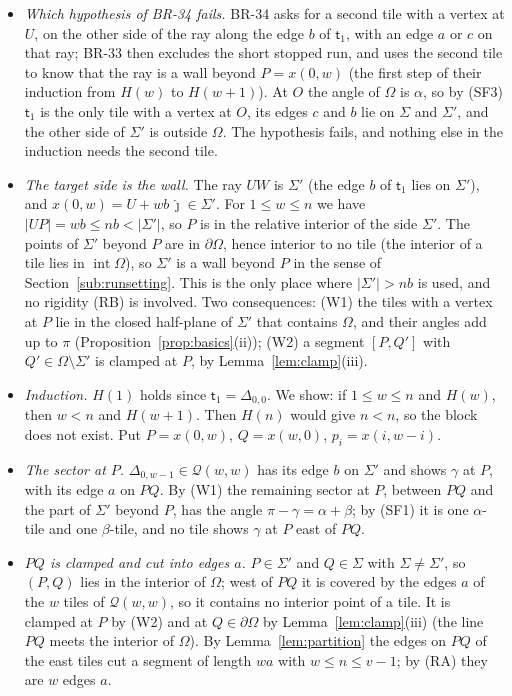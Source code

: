 \documentclass[11pt,reqno]{amsart}
\theoremstyle{plain}
\theoremstyle{definition}
\begin{document}
\begin{itemize}
\item[\textbf{Cr0}] \emph{Which hypothesis of BR-34 fails.} BR-34 asks for a second tile with a vertex at $U$, on the other side of the ray along the edge $b$ of $\mathsf t_1$, with an edge $a$ or $c$ on that ray; BR-33 then excludes the short stopped run, and uses the second tile to know that the ray is a wall beyond $P=x(0,w)$ (the first step of their induction from $H(w)$ to $H(w+1)$). At $O$ the angle of $\Omega$ is $\alpha$, so by (SF3) $\mathsf t_1$ is the only tile with a vertex at $O$, its edges $c$ and $b$ lie on $\Sigma$ and $\Sigma'$, and the other side of $\Sigma'$ is outside $\Omega$. The hypothesis fails, and nothing else in the induction needs the second tile.
\item[\textbf{Cr1}] \emph{The target side is the wall.} The ray $UW$ is $\Sigma'$ (the edge $b$ of $\mathsf t_1$ lies on $\Sigma'$), and $x(0,w)=U+wb\,\hat\jmath\in\Sigma'$. For $1\le w\le n$ we have $|UP|=wb\le nb<|\Sigma'|$, so $P$ is in the relative interior of the side $\Sigma'$. The points of $\Sigma'$ beyond $P$ are in $\partial\Omega$, hence interior to no tile (the interior of a tile lies in $\operatorname{int}\Omega$), so $\Sigma'$ is a wall beyond $P$ in the sense of Section~\ref{sub:runsetting}. This is the only place where $|\Sigma'|>nb$ is used, and no rigidity (RB) is involved. Two consequences: \textup{(W1)} the tiles with a vertex at $P$ lie in the closed half-plane of $\Sigma'$ that contains $\Omega$, and their angles add up to $\pi$ (Proposition~\ref{prop:basics}(ii)); \textup{(W2)} a segment $[P,Q']$ with $Q'\in\Omega\setminus\Sigma'$ is clamped at $P$, by Lemma~\ref{lem:clamp}(iii).
\item[\textbf{Cr2}] \emph{Induction.} $H(1)$ holds since $\mathsf t_1=\Delta_{0,0}$. We show: if $1\le w\le n$ and $H(w)$, then $w<n$ and $H(w+1)$. Then $H(n)$ would give $n<n$, so the block does not exist. Put $P=x(0,w)$, $Q=x(w,0)$, $p_i=x(i,w-i)$.
\item[\textbf{Cr3}] \emph{The sector at $P$.} $\Delta_{0,w-1}\in\mathcal Q(w,w)$ has its edge $b$ on $\Sigma'$ and shows $\gamma$ at $P$, with its edge $a$ on $PQ$. By (W1) the remaining sector at $P$, between $PQ$ and the part of $\Sigma'$ beyond $P$, has the angle $\pi-\gamma=\alpha+\beta$; by (SF1) it is one $\alpha$-tile and one $\beta$-tile, and no tile shows $\gamma$ at $P$ east of $PQ$.
\item[\textbf{Cr4}] \emph{$PQ$ is clamped and cut into edges $a$.} $P\in\Sigma'$ and $Q\in\Sigma$ with $\Sigma\ne\Sigma'$, so $(P,Q)$ lies in the interior of $\Omega$; west of $PQ$ it is covered by the edges $a$ of the $w$ tiles of $\mathcal Q(w,w)$, so it contains no interior point of a tile. It is clamped at $P$ by (W2) and at $Q\in\partial\Omega$ by Lemma~\ref{lem:clamp}(iii) (the line $PQ$ meets the interior of $\Omega$). By Lemma~\ref{lem:partition} the edges on $PQ$ of the east tiles cut a segment of length $wa$ with $w\le n\le v-1$; by (RA) they are $w$ edges $a$.

\end{itemize}
\end{document}
